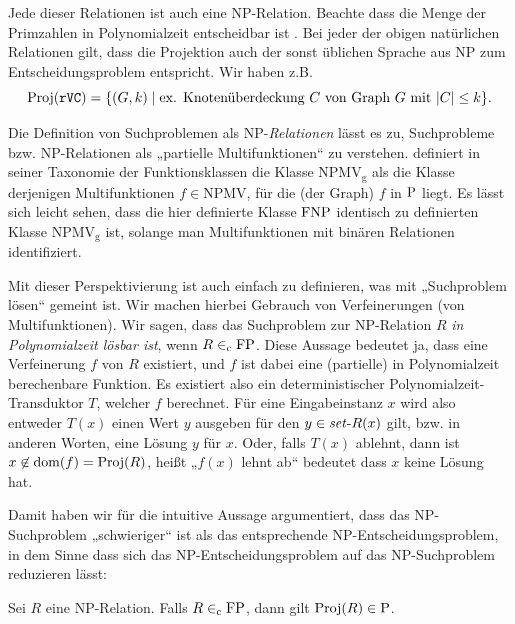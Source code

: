 Jede dieser Relationen ist auch eine NP-Relation. Beachte dass die Menge der Primzahlen in Polynomialzeit entscheidbar ist \parencite{agrawal_primes_2004}.
Bei jeder der obigen natürlichen Relationen gilt, dass die Projektion auch der sonst üblichen Sprache aus NP zum Entscheidungsproblem entspricht. Wir haben z.B.
\[ \Proj(\mathtt{rVC}) = \{ (G, k) \mid \text{ex. Knotenüberdeckung $C$ von Graph $G$ mit $|C|\leq k$} \}. \]

Die Definition von Suchproblemen als NP-\emph{Relationen} lässt es zu, Suchprobleme bzw. NP-Relationen als „partielle Multifunktionen“ zu verstehen.
\textcite{selman_taxonomy_1994} definiert in seiner Taxonomie der Funktionsklassen die Klasse $\mathrm{NPMV_g}$ als die Klasse derjenigen Multifunktionen $f\in\mathrm{NPMV}$, für die (der Graph) $f$ in $\P$ liegt.
Es lässt sich leicht sehen, dass die hier definierte Klasse $\FNP$ identisch zu \citeauthor{selman_taxonomy_1994} definierten Klasse $\mathrm{NPMV_g}$ ist, solange man Multifunktionen mit binären Relationen identifiziert.

Mit dieser Perspektivierung ist auch einfach zu definieren, was mit „Suchproblem lösen“ gemeint ist. Wir machen hierbei Gebrauch von Verfeinerungen (von Multifunktionen).
Wir sagen, dass das Suchproblem zur NP-Relation $R$ \emph{in Polynomialzeit lösbar ist}, wenn $R\inc \mathrm{FP}$.
Diese Aussage bedeutet ja, dass eine Verfeinerung $f$ von $R$ existiert, und $f$ ist dabei eine (partielle) in Polynomialzeit berechenbare Funktion. Es existiert also ein deterministischer Polynomialzeit-Transduktor $T$, welcher $f$ berechnet.
Für eine Eingabeinstanz $x$ wird also entweder $T(x)$ einen Wert $y$ ausgeben für den $y\in\fset{}R(x)$ gilt, bzw. in anderen Worten, eine Lösung $y$ für $x$.
Oder, falls $T(x)$ ablehnt, dann ist $x\not\in\dom(f)=\Proj(R)$, heißt „$f(x)$ lehnt ab“ bedeutet dass $x$ keine Lösung hat.

Damit haben wir für die intuitive Aussage argumentiert, dass das NP-Suchproblem „schwieriger“ ist als das entsprechende NP-Entscheidungsproblem, in dem Sinne dass sich das NP-Entscheidungsproblem auf das NP-Suchproblem reduzieren lässt:
\begin{observation}\label{obs:search-stronger-than-decision}
    Sei $R$ eine NP-Relation. Falls $R\inc\FP$, dann gilt $\Proj(R)\in\P$.
\end{observation}


